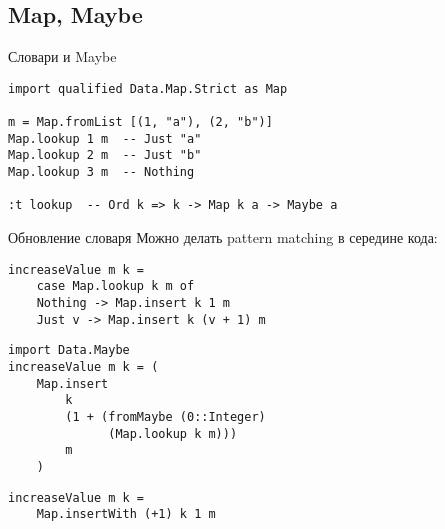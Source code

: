 \subsection{Map, Maybe}

\begin{frame}
\end{frame}

\begin{frame}[t,fragile]{Словари и Maybe}
\begin{verbatim}
import qualified Data.Map.Strict as Map

m = Map.fromList [(1, "a"), (2, "b")]
Map.lookup 1 m  -- Just "a"
Map.lookup 2 m  -- Just "b"
Map.lookup 3 m  -- Nothing

:t lookup  -- Ord k => k -> Map k a -> Maybe a
\end{verbatim}
\end{frame}

\begin{frame}[t,fragile]{Обновление словаря}
	Можно делать pattern matching в середине кода:
\begin{verbatim}
increaseValue m k =
    case Map.lookup k m of
    Nothing -> Map.insert k 1 m
    Just v -> Map.insert k (v + 1) m
\end{verbatim}
\pause
\begin{verbatim}
import Data.Maybe
increaseValue m k = (
    Map.insert
        k
        (1 + (fromMaybe (0::Integer) 
              (Map.lookup k m)))
        m
    )
\end{verbatim}
\pause
\begin{verbatim}
increaseValue m k =
    Map.insertWith (+1) k 1 m
\end{verbatim}
\end{frame}
